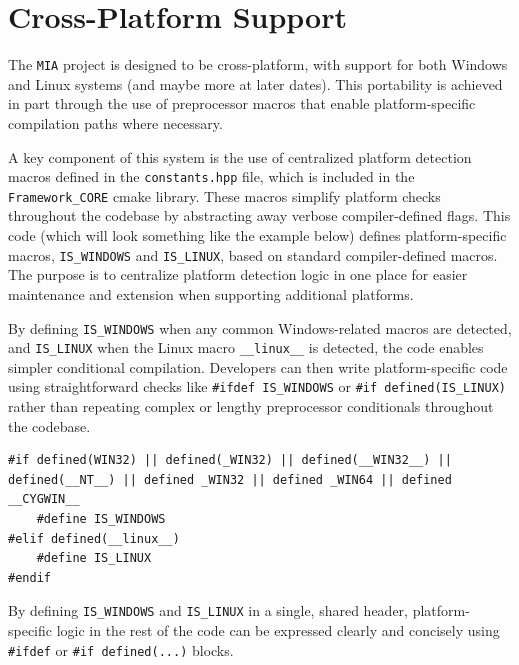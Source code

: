 \section{Cross-Platform Support}

The \texttt{MIA} project is designed to be cross-platform, with support for both Windows and Linux systems (and maybe more at later dates). This portability is achieved in part through the use of preprocessor macros that enable platform-specific compilation paths where necessary.

A key component of this system is the use of centralized platform detection macros defined in the \texttt{constants.hpp} file, which is included in the \texttt{Framework\_CORE} cmake library. These macros simplify platform checks throughout the codebase by abstracting away verbose compiler-defined flags. This code (which will look something like the example below) defines platform-specific macros, \texttt{IS\_WINDOWS} and \texttt{IS\_LINUX}, based on standard compiler-defined macros. The purpose is to centralize platform detection logic in one place for easier maintenance and extension when supporting additional platforms.

By defining \texttt{IS\_WINDOWS} when any common Windows-related macros are detected, and \texttt{IS\_LINUX} when the Linux macro \texttt{\_\_linux\_\_} is detected, the code enables simpler conditional compilation. Developers can then write platform-specific code using straightforward checks like \texttt{\#ifdef IS\_WINDOWS} or \texttt{\#if defined(IS\_LINUX)} rather than repeating complex or lengthy preprocessor conditionals throughout the codebase.

\begin{lstlisting}[style=cppstyle]
#if defined(WIN32) || defined(_WIN32) || defined(__WIN32__) || defined(__NT__) || defined _WIN32 || defined _WIN64 || defined __CYGWIN__
	#define IS_WINDOWS
#elif defined(__linux__)
	#define IS_LINUX
#endif
\end{lstlisting}

By defining \texttt{IS\_WINDOWS} and \texttt{IS\_LINUX} in a single, shared header, platform-specific logic in the rest of the code can be expressed clearly and concisely using \texttt{\#ifdef} or \texttt{\#if defined(...)} blocks.















